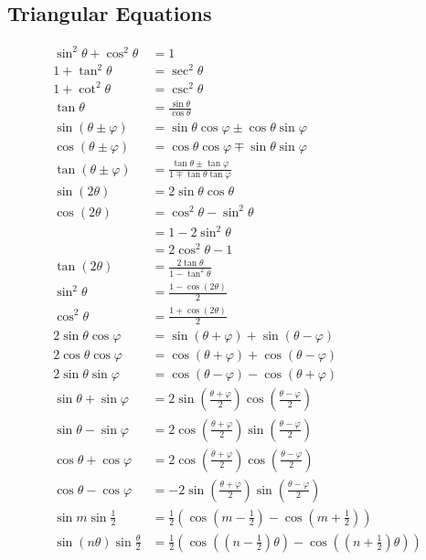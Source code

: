 \documentclass[a4paper,10pt]{article}
\begin{document}
\subsection{Triangular Equations}
\begin{align*}
    \sin^2\theta + \cos^2\theta &= 1 \\
    1 + \tan^2\theta &= \sec^2\theta \\
    1 + \cot^2\theta &= \csc^2\theta \\
    \tan\theta &= \frac{\sin\theta}{\cos\theta} \\
    \sin(\theta \pm \varphi) &= \sin\theta\cos\varphi \pm \cos\theta\sin\varphi \\
    \cos(\theta \pm \varphi) &= \cos\theta\cos\varphi \mp \sin\theta\sin\varphi \\
    \tan(\theta \pm \varphi) &= \frac{\tan\theta \pm \tan\varphi}{1 \mp \tan\theta\tan\varphi} \\
    \sin(2\theta) &= 2\sin\theta\cos\theta \\
    \cos(2\theta) &= \cos^2\theta - \sin^2\theta \\
                  &= 1 - 2\sin^2\theta \\
                  &= 2\cos^2\theta - 1 \\
    \tan(2\theta) &= \frac{2\tan\theta}{1 - \tan^2\theta} \\
    \sin^2\theta &= \frac{1 - \cos(2\theta)}{2} \\
    \cos^2\theta &= \frac{1 + \cos(2\theta)}{2} \\
    2\sin\theta\cos\varphi &= \sin(\theta + \varphi) + \sin(\theta - \varphi) \\
    2\cos\theta\cos\varphi &= \cos(\theta + \varphi) + \cos(\theta - \varphi) \\
    2\sin\theta\sin\varphi &= \cos(\theta - \varphi) - \cos(\theta + \varphi) \\
    \sin\theta + \sin\varphi &= 2\sin\left(\frac{\theta + \varphi}{2}\right)\cos\left(\frac{\theta - \varphi}{2}\right) \\
    \sin\theta - \sin\varphi &= 2\cos\left(\frac{\theta + \varphi}{2}\right)\sin\left(\frac{\theta - \varphi}{2}\right) \\
    \cos\theta + \cos\varphi &= 2\cos\left(\frac{\theta + \varphi}{2}\right)\cos\left(\frac{\theta - \varphi}{2}\right) \\
    \cos\theta - \cos\varphi &= -2\sin\left(\frac{\theta + \varphi}{2}\right)\sin\left(\frac{\theta - \varphi}{2}\right) \\
    \sin m \sin \frac{1}{2} &= \frac{1}{2}(\cos(m - \frac{1}{2}) - \cos(m + \frac{1}{2})) \\
    \sin (n\theta) \sin \frac{\theta}{2} &= \frac{1}{2}(\cos((n - \frac{1}{2})\theta) - \cos((n + \frac{1}{2})\theta)) \\
\end{align*}
\end{document}
